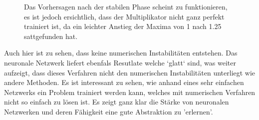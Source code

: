 \begin{figure}
\begin{tabular}{ccc}
	\end{tabular}
	\label{fig:mst_burgers_predict_2}
	\caption{Das Vorhersagen nach der stabilen Phase scheint zu funktionieren, es ist jedoch ersichtlich, dass der Multiplikator nicht ganz perfekt trainiert ist, da ein leichter Anstieg der Maxima von 1 nach 1.25 sattgefunden hat.}
\end{figure}

Auch hier ist zu sehen, dass keine numerischen Instabilitäten entstehen. Das neuronale Netzwerk liefert ebenfals Resutlate welche `glatt` sind, was weiter aufzeigt, dass dieses Verfahren nicht den numerischen Instabilitäten unterliegt wie andere Methoden. Es ist interessant zu sehen, wie anhand eines sehr einfachen Netzwerks ein Problem trainiert werden kann, welches mit numerischen Verfahren nicht so einfach zu lösen ist. Es zeigt ganz klar die Stärke von neuronalen Netzwerken und deren Fähigkeit eine gute Abstraktion zu 'erlernen'.